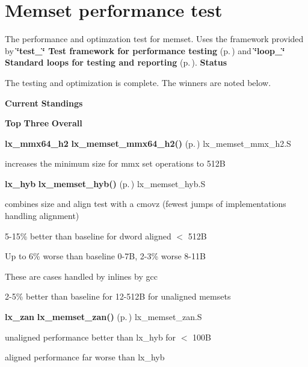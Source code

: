 \section{Memset performance test}
\label{group__memset__test}
The performance and optimzation test for memset. Uses the framework provided by {\bf \char`\"{}test\_\-\char`\"{} Test framework for performance testing} {\rm (p.\,\pageref{group__test})} and {\bf \char`\"{}loop\_\-\char`\"{} Standard loops for testing and reporting} {\rm (p.\,\pageref{group__loop__test})}. 
{\bf Status}

The testing and optimization is complete. The winners are noted below.

{\bf Current} {\bf Standings}

{\bf Top} {\bf Three} {\bf Overall}\begin{enumerate}
\item 
{\bf lx\_\-mmx64\_\-h2} {\bf lx\_\-memset\_\-mmx64\_\-h2()} {\rm (p.\,\pageref{memset_2def__test_8h_a13})} lx\_\-memset\_\-mmx\_\-h2.S\begin{CompactItemize}
\item 
increases the minimum size for mmx set operations to 512B\end{CompactItemize}
\item 
{\bf lx\_\-hyb} {\bf lx\_\-memset\_\-hyb()} {\rm (p.\,\pageref{memset_2def__test_8h_a7})} lx\_\-memset\_\-hyb.S\begin{CompactItemize}
\item 
combines size and align test with a cmovz (fewest jumps of implementations handling alignment)\item 
5-15\% better than baseline for dword aligned $<$ 512B\item 
Up to 6\% worse than baseline 0-7B, 2-3\% worse 8-11B\begin{CompactItemize}
\item 
These are cases handled by inlines by gcc\end{CompactItemize}
\item 
2-5\% better than baseline for 12-512B for unaligned memsets\end{CompactItemize}
\item 
{\bf lx\_\-zan} {\bf lx\_\-memset\_\-zan()} {\rm (p.\,\pageref{memset_2def__test_8h_a5})} lx\_\-memset\_\-zan.S\begin{CompactItemize}
\item 
unaligned performance better than lx\_\-hyb for $<$ 100B\item 
aligned performance far worse than lx\_\-hyb\end{CompactItemize}
\end{enumerate}
